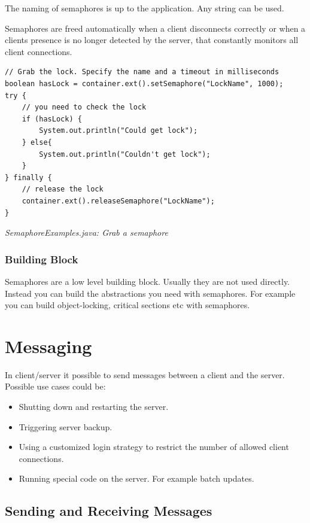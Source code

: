The naming of semaphores is up to the application. Any string can be used.

Semaphores are freed automatically when a client disconnects correctly or when a clients presence is no longer detected by the server, that constantly monitors all client connections.

\begin{lstlisting}
// Grab the lock. Specify the name and a timeout in milliseconds
boolean hasLock = container.ext().setSemaphore("LockName", 1000);
try {
    // you need to check the lock
    if (hasLock) {
        System.out.println("Could get lock");
    } else{
        System.out.println("Couldn't get lock");
    }
} finally {
    // release the lock
    container.ext().releaseSemaphore("LockName");
}
\end{lstlisting}

{\small\itshape SemaphoreExamples.java: Grab a semaphore\par}
\medskip

\subsubsection*{Building Block}

Semaphores are a low level building block. Usually they are not used directly. Instead you can build the abstractions you need with semaphores. For example you can build object-locking, critical sections etc with semaphores.

\section{Messaging}
\label{ref:client-server-messaging}

In client/server it possible to send messages between a client and the server. Possible use cases could be:

\begin{itemize}
\item Shutting down and restarting the server.
\item Triggering server backup.
\item Using a customized login strategy to restrict the number of allowed client connections.
\item Running special code on the server. For example batch updates.
\end{itemize}

\subsection*{Sending and Receiving Messages}

